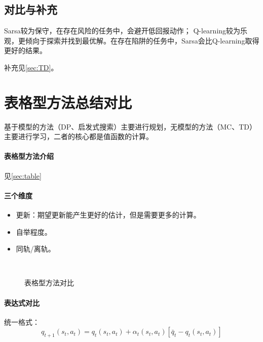 \documentclass[
12pt, %
a4paper, 
oneside, %
headinclude,footinclude, %
]{scrartcl}
\begin{document}
\subsection[对比与补充]{对比与补充}\label{sec:TD back}
Sarsa较为保守，在存在风险的任务中，会避开低回报动作； Q-learning较为乐观，更倾向于探索并找到最优解。在存在陷阱的任务中，Sarsa会比Q-learning取得更好的结果。

补充见\ref{sec:TD}。
\section{表格型方法总结对比}
基于模型的方法（DP、启发式搜索）主要进行规划，无模型的方法（MC、TD）主要进行学习，二者的核心都是值函数的计算。
\paragraph{表格型方法介绍}\label{sec:table back}
见\ref{sec:table}
\paragraph{三个维度}
\begin{itemize}
\item 更新：期望更新能产生更好的估计，但是需要更多的计算。
\item 自举程度。
\item 同轨/离轨。
\end{itemize}

\begin{figure}[H]
\centering
{} \quad
{} \\
 \quad
{} \quad
{}
\caption{表格型方法对比}
\end{figure}
\paragraph{表达式对比}
统一格式：
$$ q_{t + 1}(s_t, a_t) = q_t(s_t, a_t) + \alpha_t(s_t, a_t)[\bar{q}_t - q_t(s_t, a_t)] $$
\end{document}
